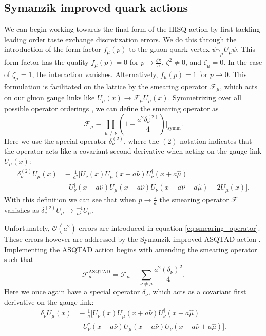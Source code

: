 \subsection{Symanzik improved quark actions}\label{sec:symanzik_improvement}
We can begin working towards the final form of the HISQ action by first tackling leading order taste exchange discretization errors.  We do this through the introduction of the form factor $f_\mu(p)$ to the gluon quark vertex $\overline{\psi}\gamma_\mu U_\mu \psi$.  This form factor has the quality $f_\mu(p) = 0$ for $p\rightarrow\frac{\zeta \pi}{a}$, $\zeta^2\neq0$, and $\zeta_\mu=0$. In the case of $\zeta_\mu = 1$, the interaction vanishes.  Alternatively, $f_\mu(p) = 1$ for $p\rightarrow0$.  This formulation is facilitated on the lattice by the smearing operator $\mathcal{F}_\mu$, which acts on our gluon gauge links like $U_\mu(x)\rightarrow\mathcal{F}_\mu U_\mu (x)$.  Symmetrizing over all possible operator orderings \cite{PhysRevD.59.074502}, we can define the smearing operator as
\begin{equation}\label{eq:smearing_operator}
    \mathcal{F}_\mu \equiv \prod_{\mu \neq \nu}\left( 
    1 + \frac{a^2 \delta_\nu^{(2)}}{4} 
    \right)\Bigg\rvert_\mathrm{symm}.
\end{equation}
Here we use the special operator $\delta_\nu^{(2)}$, where the $(2)$ notation indicates that the operator acts like a covariant second derivative when acting on the gauge link $U_\mu(x)$:
\begin{equation}\label{eq:smear_pt2}
\begin{split}
    \delta_\nu^{(2)} U_\mu (x) &\equiv \frac{1}{a^2} \Big[
    U_\nu(x)U_\mu(x+a\hat\nu)U^\dagger_\nu(x+a\hat\mu)\\
    &+ U_\nu^\dagger(x-a\hat\nu)U_\mu(x-a\hat\nu)U_\nu(x-a\hat\nu+a\hat\mu) - 2U_\mu(x)
    \Big].
\end{split}
\end{equation}
With this definition we can see that when $p \rightarrow \frac{\pi}{a}$ the smearing operator $\mathcal{F}$ vanishes as $\delta_\nu^{(2)}U_\mu \rightarrow \frac{-4}{a^2}U_\mu$.

Unfortunately, $\mathcal{O}(a^2)$ errors are introduced in equation \ref{eq:smearing_operator}. These errors however are addressed by the Symanzik-improved ASQTAD action \cite{PhysRevD.59.074502}. Implementing the ASQTAD action begins with amending the smearing operator such that
\begin{equation}\label{eq:ASQTAD_smearing}
    \mathcal{F}_\mu^\mathrm{ASQTAD} = \mathcal{F_\mu} - 
    \sum_{\nu\neq\mu}\frac{a^2(\delta_\nu)^2}{4}.
\end{equation}
Here we once again have a special operator $\delta_\nu$, which acts as a covariant first derivative on the gauge link:
\begin{equation}\label{eq:ASQTAD_smearing_pt2}
    \begin{split}
    \delta_\nu U_\mu (x) &\equiv \frac{1}{a} \Big[
    U_\nu(x)U_\mu(x+a\hat\nu)U^\dagger_\nu(x+a\hat\mu)\\
    &- U_\nu^\dagger(x-a\hat\nu)U_\mu(x-a\hat\nu)U_\nu(x-a\hat\nu+a\hat\mu)
    \Big].
\end{split}
\end{equation}

